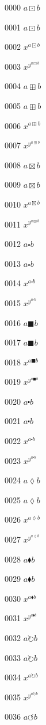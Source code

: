 \documentclass{article}
\begin{document}
0000 $a\boxdot b$\par
0001 $\displaystyle a\boxdot b$\par
0002 $x^{a\boxdot b}$\par
0003 $x^{y^{a\boxdot b}}$\par
0004 $a\boxplus b$\par
0005 $\displaystyle a\boxplus b$\par
0006 $x^{a\boxplus b}$\par
0007 $x^{y^{a\boxplus b}}$\par
0008 $a\boxtimes b$\par
0009 $\displaystyle a\boxtimes b$\par
0010 $x^{a\boxtimes b}$\par
0011 $x^{y^{a\boxtimes b}}$\par
0012 $a\square b$\par
0013 $\displaystyle a\square b$\par
0014 $x^{a\square b}$\par
0015 $x^{y^{a\square b}}$\par
0016 $a\blacksquare b$\par
0017 $\displaystyle a\blacksquare b$\par
0018 $x^{a\blacksquare b}$\par
0019 $x^{y^{a\blacksquare b}}$\par
0020 $a\centerdot b$\par
0021 $\displaystyle a\centerdot b$\par
0022 $x^{a\centerdot b}$\par
0023 $x^{y^{a\centerdot b}}$\par
0024 $a\lozenge b$\par
0025 $\displaystyle a\lozenge b$\par
0026 $x^{a\lozenge b}$\par
0027 $x^{y^{a\lozenge b}}$\par
0028 $a\blacklozenge b$\par
0029 $\displaystyle a\blacklozenge b$\par
0030 $x^{a\blacklozenge b}$\par
0031 $x^{y^{a\blacklozenge b}}$\par
0032 $a\circlearrowright b$\par
0033 $\displaystyle a\circlearrowright b$\par
0034 $x^{a\circlearrowright b}$\par
0035 $x^{y^{a\circlearrowright b}}$\par
0036 $a\circlearrowleft b$\par
\end{document}
